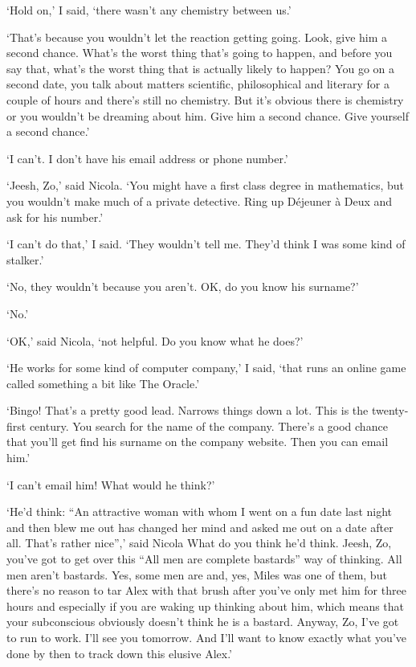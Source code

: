 `Hold on,' I said, `there wasn't any chemistry between us.'

`That's because you wouldn't let the reaction getting going. Look,
give him a second chance. What's the worst thing that's going to
happen, and before you say {\twelveit that\/}, what's the worst thing that is
actually likely to happen? You go on a second date, you talk about
matters scientific, philosophical and literary for a couple of hours
and there's still no chemistry. But it's obvious there {\twelveit is\/} chemistry or you
wouldn't be dreaming about him. Give him a second chance. Give
{\twelveit yourself\/} a second chance.'

`I can't. I don't have his email address or phone number.'

`Jeesh, Zo,' said Nicola. `You might have a first class degree in mathematics, but
you wouldn't make much of a private detective. Ring up Déjeuner
à Deux and ask for his number.'

`I can't do that,' I said. `They wouldn't tell me. They'd think I was some
kind of stalker.'

`No, they wouldn't because you aren't. OK, do you know his surname?'

`No.'

`OK,' said Nicola, `not helpful. Do you know what he does?'

`He works for some kind of computer company,' I said, `that runs an online game
called something a bit like {\twelvesl The Oracle}.'

`Bingo! That's a pretty good lead. Narrows things down a lot. This
is the twenty-first century. You search for the name of the company.
There's a good chance that you'll get find his surname on the
company website. Then you can email him.'

`I can't email him! What would he think?'

`He'd think: ``An attractive woman with whom I went on a fun date
last night and then blew me out has changed her mind and asked me out on a date after all. That's rather nice'',' said Nicola
What do you think he'd think. Jeesh, Zo, you've got to get over this
``All men are complete bastards'' way of thinking. All men aren't
bastards. Yes, some men are and, yes, Miles was one of them, but
there's no reason to tar Alex with that brush after you've only met
him for three hours and especially if you are waking up thinking
about him, which means that your subconscious obviously doesn't think he
is a bastard. Anyway, Zo, I've got to run to work. I'll see you
tomorrow. And I'll want to know exactly what you've done by then to
track down this elusive Alex.'

